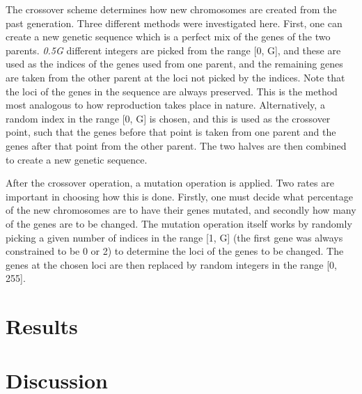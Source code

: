 \documentclass[multicolumn, 12pt]{extarticle}
\begin{document}
The crossover scheme determines how new chromosomes are created from the past generation. Three different methods were investigated here. First, one can create a new genetic sequence which is a perfect mix of the genes of the two parents. \textit{0.5G} different integers are picked from the range [0, G], and these are used as the indices of the genes used from one parent, and the remaining genes are taken from the other parent at the loci not picked by the indices. Note that the loci of the genes in the sequence are always preserved. This is the method most analogous to how reproduction takes place in nature. Alternatively, a random index in the range [0, G] is chosen, and this is used as the crossover point, such that the genes before that point is taken from one parent and the genes after that point from the other parent. The two halves are then combined to create a new genetic sequence.

After the crossover operation, a mutation operation is applied. Two rates are important in choosing how this is done. Firstly, one must decide what percentage of the new chromosomes are to have their genes mutated, and secondly how many of the genes are to be changed. The mutation operation itself works by randomly picking a given number of indices in the range [1, G] (the first gene was always constrained to be 0 or 2) to determine the loci of the genes to be changed. The genes at the chosen loci are then replaced by random integers in the range [0, 255].

\section{Results}

\section{Discussion}
\end{document}
